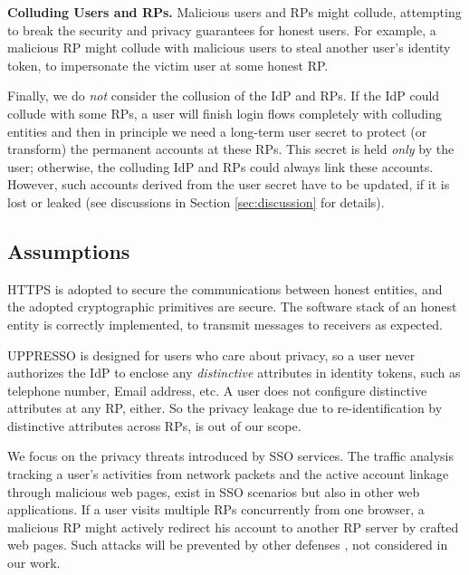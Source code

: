 \noindent \textbf{Colluding Users and RPs.}
Malicious users and RPs might collude,
 attempting to break the security and privacy guarantees for honest users.
For example, a malicious RP might collude with malicious users to steal another user's identity token,
    to impersonate the victim user at some honest RP.

Finally, we do \emph{not} consider the collusion of the IdP and RPs.
    If the IdP could collude with some RPs,
        a user will finish login flows completely with colluding entities
        and then in principle we need a long-term user secret to protect (or transform) the permanent accounts at these RPs.
This secret is held \emph{only} by the user;
    otherwise, the colluding IdP and RPs could always link these accounts.
However, such accounts derived from the user secret have to be updated,
    if it is lost or leaked
    (see discussions in Section \ref{sec:discussion} for details).

\subsection{Assumptions}
HTTPS is adopted to secure the communications between honest entities,
 and the adopted cryptographic primitives are secure.
The software stack of an honest entity is correctly implemented,
     to transmit messages to receivers as expected.

UPPRESSO is designed for users who care about privacy,
so a user never authorizes the IdP to enclose any \emph{distinctive} attributes in identity tokens,
 such as telephone number, Email address, etc.
A user does not configure  distinctive attributes at any RP, either.
So the privacy leakage due to re-identification by distinctive attributes across RPs,
    is out of our scope.

We focus on the privacy threats introduced by SSO services.
The traffic analysis tracking a user's activities from network packets
    and the active account linkage through malicious web pages,
        exist in SSO scenarios but also in other web applications.
If a user visits multiple RPs concurrently from one browser,
        a malicious RP might actively redirect his account to another RP server by crafted web pages.
Such attacks will be prevented by other defenses \cite{FedCM},
    not considered in our work.

